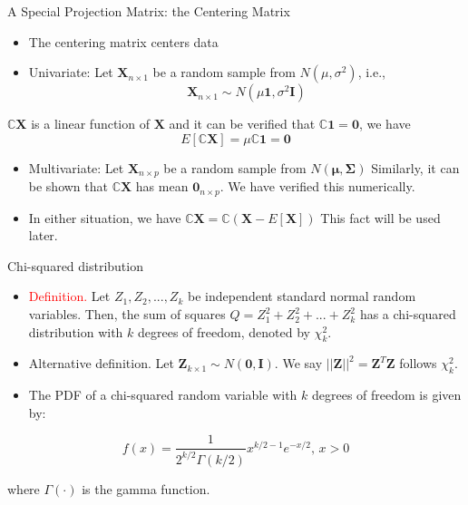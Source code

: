\documentclass[
  ignorenonframetext,
]{beamer}
\providecommand{\tightlist}{%
  \setlength{\itemsep}{0pt}\setlength{\parskip}{0pt}}
\begin{document}
\begin{frame}{A Special Projection Matrix: the Centering Matrix}
\protect\hypertarget{a-special-projection-matrix-the-centering-matrix-1}{}
\begin{itemize}
\tightlist
\item
  The centering matrix centers data
\item
  Univariate: Let \(\mathbf X_{n\times 1}\) be a random sample from
  \(N(\mu, \sigma^2)\), i.e.,
  \[\mathbf X_{n\times 1}\sim N(\mu\mathbf 1, \sigma^2 \mathbf I)\]
\end{itemize}

\(\mathbb C\mathbf X\) is a linear function of \(\mathbf X\) and it can
be verified that \(\mathbb C\mathbf 1=\mathbf 0\), we have
\[E[\mathbb C\mathbf X]=\mu \mathbb C\mathbf 1=\mathbf 0\]

\begin{itemize}
\item
  Multivariate: Let \(\mathbf X_{n\times p}\) be a random sample from
  \(N(\boldsymbol\mu, \boldsymbol \Sigma)\) Similarly, it can be shown
  that \(\mathbb C \mathbf X\) has mean \(\mathbf 0_{n\times p}\). We
  have verified this numerically.
\item
  In either situation, we have
  \(\mathbb C \mathbf X = \mathbb C (\mathbf X-E[\mathbf X])\) This fact
  will be used later.
\end{itemize}
\end{frame}

\begin{frame}{Chi-squared distribution}
\protect\hypertarget{chi-squared-distribution}{}
\begin{itemize}
\item
  \textcolor{red}{Definition.} Let \(Z_1, Z_2, ..., Z_k\) be independent
  standard normal random variables. Then, the sum of squares
  \(Q = Z_1^2 + Z_2^2 + ... + Z_k^2\) has a chi-squared distribution
  with \(k\) degrees of freedom, denoted by \(\chi_k^2\).
\item
  Alternative definition. Let
  \(\mathbf Z_{k\times 1} \sim N(\mathbf 0, \mathbf I)\). We say
  \(||\mathbf Z||^2=\mathbf Z^T \mathbf Z\) follows \(\chi_k^2\).
\item
  The PDF of a chi-squared random variable with \(k\) degrees of freedom
  is given by:
\end{itemize}

\[
f(x) = \frac{1}{2^{k/2}\Gamma(k/2)} x^{k/2-1} e^{-x/2} \mbox{,  } x>0
\]

where \(\Gamma(\cdot)\) is the gamma function.
\end{frame}
\end{document}

